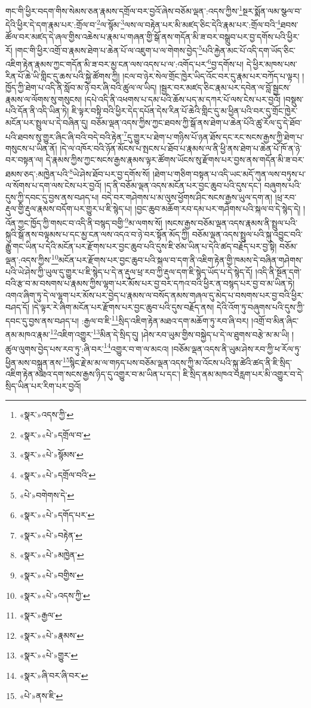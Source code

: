 གང་གི་ཕྱིར་བདག་གིས་སེམས་ཅན་རྣམས་དགྲོལ་བར་བྱའོ་ཞེས་བཅོམ་ལྡན་:འདས་ཀྱིས་\footnote{«སྣར་»འདས་ཀྱི་}སྔར་སྨོན་ལམ་སྩལ་བ་དེའི་ཕྱིར་དེ་དག་རྣམ་པར་:གྲོལ་བ་\footnote{«སྣར་»«པེ་»དགྲོལ་བ་}ལ་སྙོམ་\footnote{«སྣར་»«པེ་»སྙོམས་}ལས་ལ་བརྟེན་པར་མི་མཛད་ཅིང་དེའི་རྣམ་པར་:གྲོལ་བའི་\footnote{«སྣར་»«པེ་»དགྲོལ་བའི་}ཐབས་ཚོལ་བར་མཛད་དེ་ཞལ་གྱིས་འཆེས་པ་རྣམ་པ་གཞན་གྱི་སྒོ་ནས་གདོན་མི་ཟ་བར་བསྒྲུབ་པར་བྱ་དགོས་པའི་ཕྱིར་རོ། །གང་གི་ཕྱིར་འགྲོ་བ་རྣམས་ཐེག་པ་ཆེན་པོ་ལ་འཇུག་པ་ལ་གེགས་བྱེད་\footnote{«པེ་»བགེགས་ེད་}པའི་རྐྱེན་མང་པོ་འདི་དག་ཡོད་ཅིང་འཇིག་རྟེན་རྣམས་ཀྱང་གདོན་མི་ཟ་བར་མྱ་ངན་ལས་འདས་པ་ལ་:འགོད་པར་\footnote{«སྣར་»«པེ་»དགོད་པར་}བྱ་དགོས་པ། དེ་ཕྱིར་མཁས་པས་རིན་པོ་ཆེ་ཡི་གླིང་དུ་ཆས་པའི་སྐྱེ་ཚོགས་ཀྱི། །ངལ་བ་ཉེར་སེལ་གྲོང་ཁྱེར་ཡིད་འོང་བར་དུ་རྣམ་པར་བཀོད་པ་ལྟར། །ཁྱོད་ཀྱི་ཐེག་པ་འདི་ནི་སློབ་མ་ཉེ་བར་ཞི་བའི་ཚུལ་ལ་ཡིད། །སྦྱར་བར་མཛད་ཅིང་རྣམ་པར་དབེན་ལ་བློ་སྦྱངས་རྣམས་ལ་ལོགས་སུ་གསུངས། །དཔེ་འདི་ནི་འཕགས་པ་དམ་པའི་ཆོས་པད་མ་དཀར་པོ་ལས་ངེས་པར་བྱའོ། །བསྡུས་པའི་དོན་ནི་འདི་ཡིན་ཏེ། ཇི་ལྟར་བསྟི་བའི་ཕྱིར་དེད་དཔོན་དེས་རིན་པོ་ཆེའི་གླིང་དུ་མ་ཕྱིན་པའི་བར་དུ་གྲོང་ཁྱེར་མངོན་པར་སྤྲུལ་པ་དེ་བཞིན་དུ། བཅོམ་ལྡན་འདས་ཀྱིས་ཀྱང་ཐབས་ཀྱི་སྒོ་ནས་ཐེག་པ་ཆེན་པོའི་ཚུ་རོལ་དུ་དེ་ཐོབ་པའི་ཐབས་སུ་གྱུར་ཞིང་ཞི་བའི་བདེ་བའི་རྟེན་\footnote{«སྣར་»«པེ་»བརྟེན་}དུ་གྱུར་པ་ཐེག་པ་གཉིས་པོ་ཉན་ཐོས་དང་རང་སངས་རྒྱས་ཀྱི་ཐེག་པ་གསུངས་པ་ཡིན་ནོ། །དེ་ལ་འཁོར་བའི་ཉོན་མོངས་པ་སྤངས་པ་ཐོབ་པ་རྣམས་ལ་ནི་ཕྱི་ནས་ཐེག་པ་ཆེན་པོ་ཁོ་ན་ཉེ་བར་བསྟན་ལ། དེ་རྣམས་ཀྱིས་ཀྱང་སངས་རྒྱས་རྣམས་ལྟར་ཚོགས་ཡོངས་སུ་རྫོགས་པར་བྱས་ནས་གདོན་མི་ཟ་བར་ཐམས་ཅད་:མཁྱེན་པའི་\footnote{«སྣར་»«པེ་»མཁྱེན་}ཡེ་ཤེས་ཐོབ་པར་བྱ་དགོས་སོ། །ཐེག་པ་གཅིག་བསྟན་པ་འདི་ཡང་མདོ་ཀུན་ལས་བཏུས་པ་ལ་སོགས་པ་དག་ལས་ངེས་པར་བྱའོ། །ད་ནི་བཅོམ་ལྡན་འདས་མངོན་པར་བྱང་ཆུབ་པའི་དུས་དང་། བཞུགས་པའི་དུས་ཀྱི་དབང་དུ་བྱས་ནས་བཤད་པ། བདེ་བར་གཤེགས་པ་མ་ལུས་ཕྱོགས་ཤིང་སངས་རྒྱས་ཡུལ་དག་ན། །ཕྲ་རབ་རྡུལ་གྱི་རྡུལ་རྣམས་བདོག་པར་གྱུར་པ་ཇི་སྙེད་པ། །བྱང་ཆུབ་མཆོག་རབ་དམ་པར་གཤེགས་པའི་སྐལ་བ་དེ་སྙེད་དེ། །འོན་ཀྱང་ཁྱོད་ཀྱི་གསང་བ་འདི་ནི་བསྙད་བགྱི་\footnote{«སྣར་»«པེ་»བགྱིས་}མ་ལགས་སོ། །སངས་རྒྱས་བཅོམ་ལྡན་འདས་རྣམས་ནི་སྤྲུལ་པའི་སྐུའི་སྒོ་ནས་བལྟམས་པ་དང་མྱ་ངན་ལས་འདའ་བ་ཉེ་བར་སྟོན་མོད་ཀྱི། བཅོམ་ལྡན་འདས་སྤྲུལ་པའི་སྐུ་འབྱུང་བའི་རྒྱུ་གང་ཡིན་པ་དེའི་མངོན་པར་རྫོགས་པར་བྱང་ཆུབ་པའི་དུས་ཇི་ཙམ་ཡིན་པ་དེའི་ཚད་བརྗོད་པར་བྱ་སྟེ། བཅོམ་ལྡན་:འདས་ཀྱིས་\footnote{«སྣར་»«པེ་»འདས་ཀྱི་}མངོན་པར་རྫོགས་པར་བྱང་ཆུབ་པའི་སྐལ་བ་དག་ནི་འཇིག་རྟེན་གྱི་ཁམས་དེ་བཞིན་གཤེགས་པའི་ཡེ་ཤེས་ཀྱི་ཡུལ་དུ་གྱུར་པ་ཇི་སྙེད་པ་དེ་ན་རྡུལ་ཕྲ་རབ་ཀྱི་རྡུལ་དག་ཇི་སྙེད་ཡོད་པ་དེ་སྙེད་དོ། །འདི་ནི་སྔོན་དགེ་བའི་རྩ་བ་མ་བསགས་པ་རྣམས་ཀྱིས་ལྷག་པར་མོས་པར་བྱ་བར་དཀའ་བའི་ཕྱིར་ན་བསྙད་པར་བྱ་བ་མ་ཡིན་ཏེ། འགའ་ཞིག་ཏུ་དེ་ལ་ལྷག་པར་མོས་པར་བྱེད་པ་རྣམས་ལ་བསོད་ནམས་གཞལ་དུ་མེད་པ་བསགས་པར་བྱ་བའི་ཕྱིར་བཤད་དོ། །དེ་ལྟར་རེ་ཞིག་མངོན་པར་རྫོགས་པར་བྱང་ཆུབ་པའི་དུས་བརྗོད་ནས། དེའི་འོག་ཏུ་བཞུགས་པའི་དུས་ཀྱི་དབང་དུ་བྱས་ནས་བཤད་པ། :རྒྱལ་བ་ཇི་\footnote{«སྣར་»རྒྱལ་}སྲིད་འཇིག་རྟེན་མཐའ་དག་མཆོག་ཏུ་རབ་ཞི་བར། །འགྲོ་བ་མིན་ཞིང་ནམ་མཁའ་རྣམ་\footnote{«སྣར་»«པེ་»རྣམས་}འཇིག་འགྱུར་\footnote{«སྣར་»«པེ་»གྱུར་}མིན་དེ་སྲིད་དུ། །ཤེས་རབ་ཡུམ་གྱིས་བསྐྱེད་པ་དེ་ལ་ཐུགས་བརྩེ་མ་མ་ཡི། །ཚུལ་ལུགས་བྱེད་པས་རབ་ཏུ་:ཞི་བར་\footnote{«སྣར་»ཞི་བར་ཞི་བར་}འགྱུར་བ་ག་ལ་མངའ། །བཅོམ་ལྡན་འདས་ནི་ཡུམ་ཤེས་རབ་ཀྱི་ཕ་རོལ་ཏུ་ཕྱིན་མས་བསྐྲུན་ནས་\footnote{«པེ་»ནས་ཇི་}སྙིང་རྗེ་མ་མ་ལ་གཏད་པས་བཅོམ་ལྡན་འདས་ཀྱི་མ་འོངས་པའི་སྐུ་ཚེའི་ཚད་ནི་ཇི་སྲིད་འཇིག་རྟེན་མཐའ་དག་སངས་རྒྱས་ཉིད་དུ་འགྱུར་བ་མ་ཡིན་པ་དང་། ཇི་སྲིད་ནམ་མཁའ་བརླག་པར་མི་འགྱུར་བ་དེ་སྲིད་ཡིན་པར་རིག་པར་བྱའོ། 